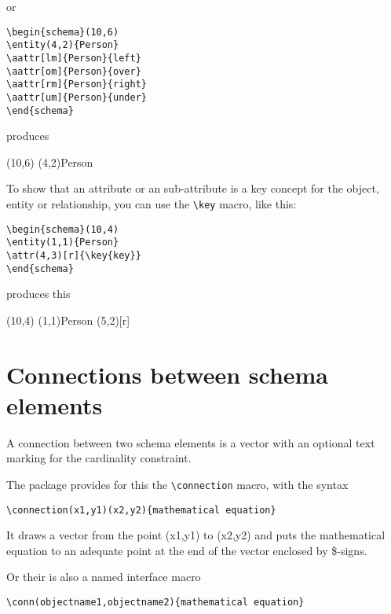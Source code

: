 \documentclass[a4paper,11pt]{article}
\begin{document}
or

\begin{verbatim}
\begin{schema}(10,6)
\entity(4,2){Person}
\aattr[lm]{Person}{left}
\aattr[om]{Person}{over}
\aattr[rm]{Person}{right}
\aattr[um]{Person}{under}
\end{schema}
\end{verbatim}

produces

\begin{schema}(10,6)
\entity(4,2){Person}
\end{schema}

To show that an attribute or an sub-attribute is a key concept for the object, entity or relationship,
you can use the \verb|\key| macro, like this:

\begin{verbatim}
\begin{schema}(10,4)
\entity(1,1){Person}
\attr(4,3)[r]{\key{key}}
\end{schema}
\end{verbatim}

produces this

\begin{schema}(10,4)
\entity(1,1){Person}
\attr(5,2)[r]{}
\end{schema}

\section{Connections between schema elements}

A connection between two schema elements is a vector with an optional
text marking for the cardinality constraint.

The package provides for this the \verb|\connection| macro, with the syntax

\begin{verbatim}
\connection(x1,y1)(x2,y2){mathematical equation}
\end{verbatim}

It draws a vector from the point (x1,y1) to (x2,y2) and puts the mathematical 
equation to an adequate point at the end of the vector enclosed by \$-signs. 

Or their is also a named interface macro 

\begin{verbatim}
\conn(objectname1,objectname2){mathematical equation}
\end{verbatim}
\end{document}
